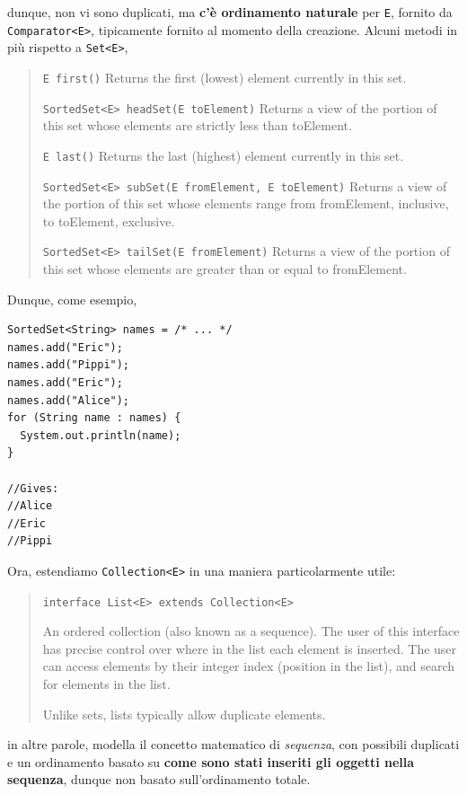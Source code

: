 \documentclass[\fontsizeclass,twocolumn]{\classname}
\theoremstyle{definition}
\theoremstyle{definition}
\begin{document}
dunque, non vi sono duplicati, ma \textbf{c'è ordinamento naturale} per
\texttt{E}, fornito da \texttt{Comparator<E>}, tipicamente fornito al momento
della creazione. Alcuni metodi in più rispetto a \texttt{Set<E>},

\begin{quote}
    \footnotesize{\texttt{E 	first()} 	Returns the first (lowest) element currently in this set.

\texttt{SortedSet<E> 	headSet(E toElement)} 	Returns a view of the portion of this set whose elements are strictly less than toElement.

\texttt{E 	last()} 	Returns the last (highest) element currently in this set.

\texttt{SortedSet<E> 	subSet(E fromElement, E toElement)} 	Returns a view of the portion of this set whose elements range from fromElement, inclusive, to toElement, exclusive.

\texttt{SortedSet<E> 	tailSet(E fromElement)} 	Returns a view of the portion of this set whose elements are greater than or equal to fromElement.}
\end{quote}

Dunque, come esempio,

\begin{lstlisting}
SortedSet<String> names = /* ... */
names.add("Eric");
names.add("Pippi");
names.add("Eric");
names.add("Alice");
for (String name : names) {
  System.out.println(name);
}

//Gives:
//Alice
//Eric
//Pippi
\end{lstlisting}

Ora, estendiamo \texttt{Collection<E>} in una maniera particolarmente utile:
\begin{quote}
    \footnotesize{\texttt{interface List<E> extends Collection<E>}

        An ordered collection (also known as a sequence). The user of this interface has precise control over where in the list each element is inserted. The user can access elements by their integer index (position in the list), and search for elements in the list.

Unlike sets, lists typically allow duplicate elements.
}
\end{quote}

in altre parole, modella il concetto matematico di \emph{sequenza}, con
possibili duplicati e un ordinamento basato su \textbf{come sono stati inseriti
gli oggetti nella sequenza}, dunque non basato sull'ordinamento totale.
\end{document}
